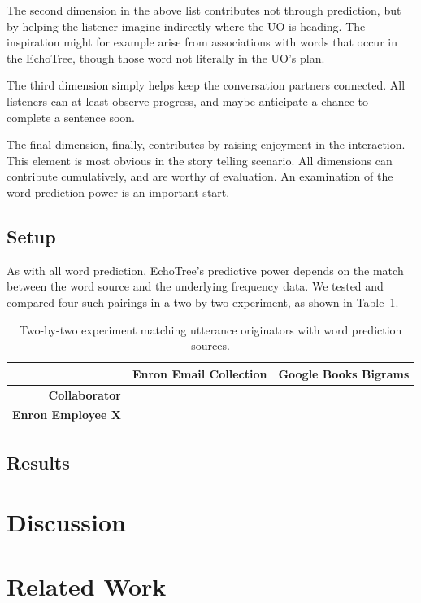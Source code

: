 \documentclass{sigchi}
\begin{document}
The second dimension in the above list contributes not through
prediction, but by helping the listener imagine indirectly where the
UO is heading. The inspiration might for example arise from
associations with words that occur in the EchoTree, though those word
not literally in the UO's plan.

The third dimension simply helps keep the conversation partners
connected. All listeners can at least observe progress, and maybe
anticipate a chance to complete a sentence soon.

The final dimension, finally, contributes by raising enjoyment in the
interaction. This element is most obvious in the story telling
scenario. All dimensions can contribute cumulatively, and are worthy
of evaluation. An examination of the word prediction power is an
important start. 

\subsection{Setup}
As with all word prediction, EchoTree's predictive power depends on
the match between the word source and the underlying frequency
data. We tested and compared four such pairings in a two-by-two
experiment, as shown in Table~\ref{tab:conditions}.

\begin{table}
    \begin{tabular}{|r|c|c|}
        \hline
        ~                & {\bf Enron Email Collection} & {\bf Google Books Bigrams} \\ \hline
        {\bf Collaborator}     & ~                      & ~                    \\ 
        {\bf Enron Employee X} & ~                      & ~                    \\
        \hline
    \end{tabular}
    \caption{Two-by-two experiment matching utterance originators with
      word prediction sources.}
    \label{tab:conditions}
\end{table}

\subsection{Results}
\section{Discussion}
\section{Related Work}
\end{document}
